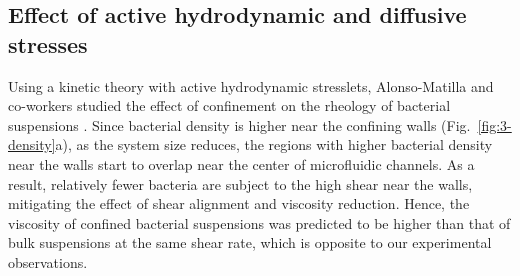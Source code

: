 \subsection{Effect of active hydrodynamic and diffusive stresses}

Using a kinetic theory with active hydrodynamic stresslets, Alonso-Matilla and co-workers studied the effect of confinement
on the rheology of bacterial suspensions \cite{Alonso-Matilla2016}. Since bacterial density is higher near the confining walls (Fig.~\ref{fig:3-density}a), as the system size reduces, the regions with higher bacterial density near the walls start to overlap near the center of microfluidic channels. As a result, relatively fewer bacteria are subject to the high shear near the walls, mitigating the effect of shear alignment and viscosity reduction. Hence, the viscosity of confined bacterial suspensions was predicted
to be higher than that of bulk suspensions at the same shear rate, which is opposite to our experimental observations.

